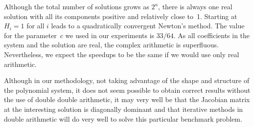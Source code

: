 \documentclass{article}
\begin{document}
Although the total number of solutions grows as $2^n$,
there is always one real solution with all its components positive
and relatively close to~1.  Starting at $H_i = 1$ for all $i$
leads to a quadratically convergent Newton's method.
The value for the parameter~$c$ we used in our experiments is $33/64$.
As all coefficients in the system and the solution are real,
the complex arithmetic is superfluous.  Nevertheless, we expect
the speedups to be the same if we would use only real arithmetic.

Although in our methodology, not taking advantage of
the shape and structure of the polynomial system,
it does not seem possible to obtain correct results without
the use of double double arithmetic, it may very well be
that the Jacobian matrix at the interesting solution is
diagonally dominant and that iterative methods in double arithmetic
will do very well to solve this particular benchmark problem.
\end{document}
